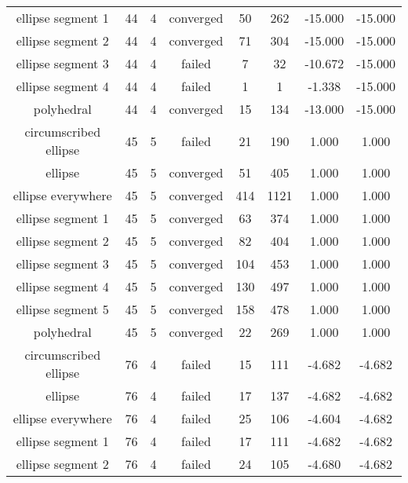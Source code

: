 \begin{footnotesize}
\begin{center}
\begin{longtable}{ c c c c c c c c }
    ellipse segment 1     &   44  &  4  & converged  &   50  &  262  &  -15.000   &  -15.000   \\
    ellipse segment 2     &   44  &  4  & converged  &   71  &  304  &  -15.000   &  -15.000   \\
    ellipse segment 3     &   44  &  4  &   failed   &   7   &   32  &  -10.672   &  -15.000   \\
    ellipse segment 4     &   44  &  4  &   failed   &   1   &   1   &   -1.338   &  -15.000   \\
        polyhedral        &   44  &  4  & converged  &   15  &  134  &  -13.000   &  -15.000   \\
  circumscribed ellipse   &   45  &  5  &   failed   &   21  &  190  &   1.000    &   1.000    \\
         ellipse          &   45  &  5  & converged  &   51  &  405  &   1.000    &   1.000    \\
    ellipse everywhere    &   45  &  5  & converged  &  414  &  1121 &   1.000    &   1.000    \\
    ellipse segment 1     &   45  &  5  & converged  &   63  &  374  &   1.000    &   1.000    \\
    ellipse segment 2     &   45  &  5  & converged  &   82  &  404  &   1.000    &   1.000    \\
    ellipse segment 3     &   45  &  5  & converged  &  104  &  453  &   1.000    &   1.000    \\
    ellipse segment 4     &   45  &  5  & converged  &  130  &  497  &   1.000    &   1.000    \\
    ellipse segment 5     &   45  &  5  & converged  &  158  &  478  &   1.000    &   1.000    \\
        polyhedral        &   45  &  5  & converged  &   22  &  269  &   1.000    &   1.000    \\
  circumscribed ellipse   &   76  &  4  &   failed   &   15  &  111  &   -4.682   &   -4.682   \\
         ellipse          &   76  &  4  &   failed   &   17  &  137  &   -4.682   &   -4.682   \\
    ellipse everywhere    &   76  &  4  &   failed   &   25  &  106  &   -4.604   &   -4.682   \\
    ellipse segment 1     &   76  &  4  &   failed   &   17  &  111  &   -4.682   &   -4.682   \\
    ellipse segment 2     &   76  &  4  &   failed   &   24  &  105  &   -4.680   &   -4.682   \\

\end{longtable}
\end{center}
\end{footnotesize}
